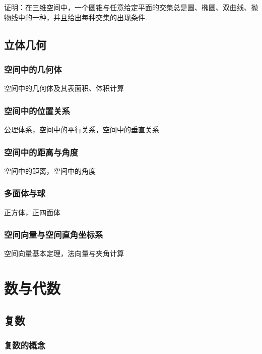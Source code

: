 \documentclass[lang=cn, zihao=5]{elegantbook}
\begin{document}
\begin{problem}
	证明：在三维空间中，一个圆锥与任意给定平面的交集总是圆、椭圆、双曲线、抛物线中的一种，并且给出每种交集的出现条件.
\end{problem}


\chapter{立体几何}

\section{空间中的几何体}

空间中的几何体及其表面积、体积计算

\section{空间中的位置关系}

公理体系，空间中的平行关系，空间中的垂直关系

\section{空间中的距离与角度}

空间中的距离，空间中的角度

\section{多面体与球}

正方体，正四面体

\section{空间向量与空间直角坐标系}

空间向量基本定理，法向量与夹角计算





\part{数与代数}

\chapter{复数}

\section{复数的概念}
\end{document}
